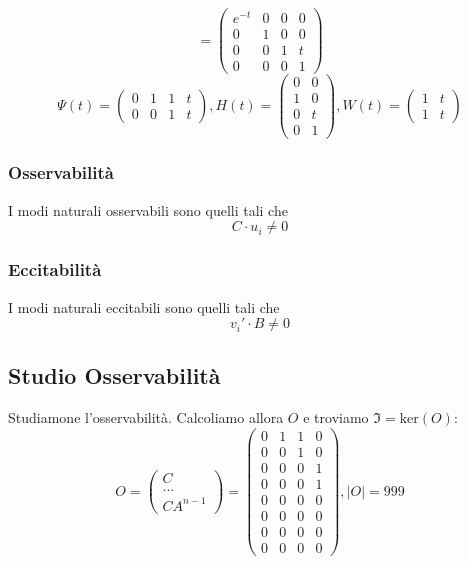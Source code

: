 \documentclass{article}
\begin{document}
\[ = \left(\begin{matrix}e^{- t} & 0 & 0 & 0\\0 & 1 & 0 & 0\\0 & 0 & 1 & t\\0 & 0 & 0 & 1\end{matrix}\right) \]\[ \Psi(t) = \left(\begin{matrix}0 & 1 & 1 & t\\0 & 0 & 1 & t\end{matrix}\right), H(t) =  \left(\begin{matrix}0 & 0\\1 & 0\\0 & t\\0 & 1\end{matrix}\right),W(t) = \left(\begin{matrix}1 & t\\1 & t\end{matrix}\right)\]\subsubsection{Osservabilità}
 I modi naturali osservabili sono quelli tali che 
\[ C \cdot u_i   \neq 0\]
\subsubsection{Eccitabilità}
 I modi naturali eccitabili sono quelli tali che 
\[v_i' \cdot B \neq 0\]

\subsection{Studio Osservabilità}

Studiamone l'osservabilità. Calcoliamo allora $O$ e troviamo $\mathfrak{I} = \text{ker}(O)$:
\[
 O = \begin{pmatrix}C \\ ... \\ CA^{n-1}  \end{pmatrix} = \left(\begin{matrix}0 & 1 & 1 & 0\\0 & 0 & 1 & 0\\0 & 0 & 0 & 1\\0 & 0 & 0 & 1\\0 & 0 & 0 & 0\\0 & 0 & 0 & 0\\0 & 0 & 0 & 0\\0 & 0 & 0 & 0\end{matrix}\right), |O| = 999 \]
\end{document}
